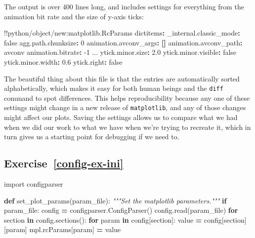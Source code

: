 \documentclass[
]{krantz}
\makeatletter
\newenvironment{Shaded}{\begin{snugshade}}{\end{snugshade}}
\newcommand{\AttributeTok}[1]{\textcolor[rgb]{0.77,0.63,0.00}{#1}}
\newcommand{\CharTok}[1]{\textcolor[rgb]{0.31,0.60,0.02}{#1}}
\newcommand{\CommentTok}[1]{\textcolor[rgb]{0.56,0.35,0.01}{\textit{#1}}}
\newcommand{\ControlFlowTok}[1]{\textcolor[rgb]{0.13,0.29,0.53}{\textbf{#1}}}
\newcommand{\DecValTok}[1]{\textcolor[rgb]{0.00,0.00,0.81}{#1}}
\newcommand{\FloatTok}[1]{\textcolor[rgb]{0.00,0.00,0.81}{#1}}
\newcommand{\FunctionTok}[1]{\textcolor[rgb]{0.00,0.00,0.00}{#1}}
\newcommand{\ImportTok}[1]{#1}
\newcommand{\KeywordTok}[1]{\textcolor[rgb]{0.13,0.29,0.53}{\textbf{#1}}}
\newcommand{\NormalTok}[1]{#1}
\newcommand{\OperatorTok}[1]{\textcolor[rgb]{0.81,0.36,0.00}{\textbf{#1}}}
\newcommand{\OtherTok}[1]{\textcolor[rgb]{0.56,0.35,0.01}{#1}}
\newenvironment{kframe}{%
\medskip{}
\setlength{\fboxsep}{.8em}
 \def\at@end@of@kframe{}%
 \ifinner\ifhmode%
  \def\at@end@of@kframe{\end{minipage}}%
  \begin{minipage}{\columnwidth}%
 \fi\fi%
 \def\FrameCommand##1{\hskip\@totalleftmargin \hskip-\fboxsep
 \colorbox{shadecolor}{##1}\hskip-\fboxsep
     \hskip-\linewidth \hskip-\@totalleftmargin \hskip\columnwidth}%
 \MakeFramed {\advance\hsize-\width
   \@totalleftmargin\z@ \linewidth\hsize
   \@setminipage}}%
 {\par\unskip\endMakeFramed%
 \at@end@of@kframe}
\renewenvironment{Shaded}{\begin{kframe}}{\end{kframe}}
\makeatother
\begin{document}
The output is over 400 lines long,
and includes settings for everything from the animation bit rate and the size of y-axis ticks:

\begin{Shaded}
\begin{Highlighting}[]
\OtherTok{!!python/object/new:matplotlib.RcParams}
\FunctionTok{dictitems}\KeywordTok{:}
\AttributeTok{  }\FunctionTok{\_internal.classic\_mode}\KeywordTok{:}\AttributeTok{ }\CharTok{false}
\AttributeTok{  }\FunctionTok{agg.path.chunksize}\KeywordTok{:}\AttributeTok{ }\DecValTok{0}
\AttributeTok{  }\FunctionTok{animation.avconv\_args}\KeywordTok{:}\AttributeTok{ }\KeywordTok{[]}
\AttributeTok{  }\FunctionTok{animation.avconv\_path}\KeywordTok{:}\AttributeTok{ avconv}
\AttributeTok{  }\FunctionTok{animation.bitrate}\KeywordTok{:}\AttributeTok{ }\DecValTok{{-}1}
\AttributeTok{  ...}
\AttributeTok{  }\FunctionTok{ytick.minor.size}\KeywordTok{:}\AttributeTok{ }\FloatTok{2.0}
\AttributeTok{  }\FunctionTok{ytick.minor.visible}\KeywordTok{:}\AttributeTok{ }\CharTok{false}
\AttributeTok{  }\FunctionTok{ytick.minor.width}\KeywordTok{:}\AttributeTok{ }\FloatTok{0.6}
\AttributeTok{  }\FunctionTok{ytick.right}\KeywordTok{:}\AttributeTok{ }\CharTok{false}
\end{Highlighting}
\end{Shaded}

The beautiful thing about this file is that the entries are automatically sorted alphabetically,
which makes it easy for both human beings and the \texttt{diff} command to spot differences.
This helps reproducibility because any one of these settings might change
in a new release of \texttt{matplotlib},
and any of those changes might affect our plots.
Saving the settings allows us to compare what we had when we did our work
to what we have when we're trying to recreate it,
which in turn gives us a starting point for debugging if we need to.

\hypertarget{exercise-refconfig-ex-ini}{%
\subsection*{Exercise~\ref{config-ex-ini}}\label{exercise-refconfig-ex-ini}}


\begin{Shaded}
\begin{Highlighting}[]
\ImportTok{import}\NormalTok{ configparser}

\KeywordTok{def}\NormalTok{ set\_plot\_params(param\_file):}
    \CommentTok{"""Set the matplotlib parameters."""}
    \ControlFlowTok{if}\NormalTok{ param\_file:}
\NormalTok{        config }\OperatorTok{=}\NormalTok{ configparser.ConfigParser()}
\NormalTok{        config.read(param\_file)}
        \ControlFlowTok{for}\NormalTok{ section }\KeywordTok{in}\NormalTok{ config.sections():}
            \ControlFlowTok{for}\NormalTok{ param }\KeywordTok{in}\NormalTok{ config[section]:}
\NormalTok{                value }\OperatorTok{=}\NormalTok{ config[section][param]}
\NormalTok{                mpl.rcParams[param] }\OperatorTok{=}\NormalTok{ value}
\end{Highlighting}
\end{Shaded}
\end{document}
